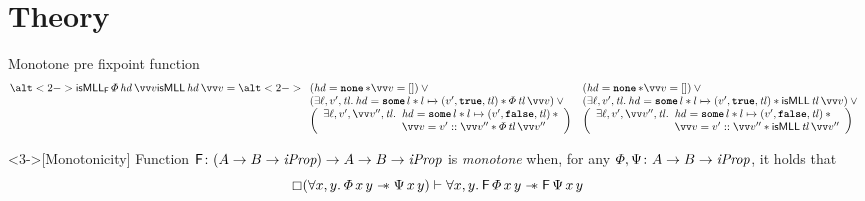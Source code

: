 \documentclass[aspectratio=169]{beamer}
\begin{document}
\section{Theory}
\begin{frame}{Monotone pre fixpoint function}
    \begin{align*}
        \alt<2->
        {\isMLL_{\hopred}\, \pred\, \hd\, \vect{\val}}{\isMLL\, \hd\, \vect{\val}} = \alt<2->{\isMLLFDef}{\isMLLRecDef}
    \end{align*}

    \begin{definition}<3->[Monotonicity]
        Function $\textsf{\upshape F}\colon (A \to B \to \textit{iProp}) \to A \to B \to \textit{iProp}$ is \emph{monotone} when, for any $\varPhi, \Psi\colon A \to B \to \textit{iProp}$, it holds that
        \[ \always(\All \var, \varB. \pred\,\var\,\varB \wand \predB\,\var\,\varB) \proves \All \var, \varB. \hopred\,\pred\,\var\,\varB \wand \hopred\,\predB\,\var\,\varB\]
    \end{definition}
\end{frame}
\end{document}
